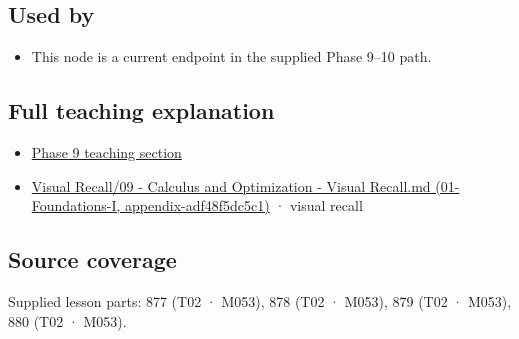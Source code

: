 \subsection{Used by}\label{appendix-2c2df8345991-used-by}

\begin{itemize}
\tightlist
\item
  This node is a current endpoint in the supplied Phase 9--10 path.
\end{itemize}

\subsection{Full teaching explanation}\label{appendix-2c2df8345991-full-teaching-explanation}

\begin{itemize}
\tightlist
\item
  \hyperref[02-foundations-ii-ch026-optimization-and-inverse-problems]{Phase 9 teaching section}
\item
  \href{../01-Foundations-I/main.pdf\#nameddest=appendix-adf48f5dc5c1}{Visual Recall/09 - Calculus and Optimization - Visual Recall.md (01-Foundations-I, appendix-adf48f5dc5c1)} · visual recall
\end{itemize}

\subsection{Source coverage}\label{appendix-2c2df8345991-source-coverage}

Supplied lesson parts: 877 (T02 · M053), 878 (T02 · M053), 879 (T02 · M053), 880 (T02 · M053).
